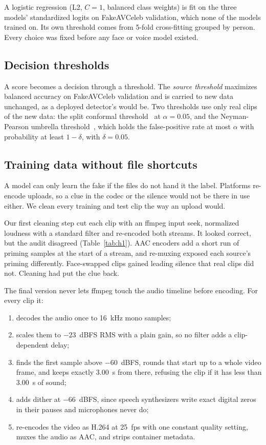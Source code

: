 \documentclass[conference]{IEEEtran}
\begin{document}
A logistic regression (L2, $C = 1$, balanced class weights) is fit on the
three models' standardized logits on FakeAVCeleb validation, which none of the
models trained on. Its own threshold comes from 5-fold cross-fitting grouped
by person. Every choice was fixed before any face or voice model existed.

\subsection{Decision thresholds}
\label{sec:compare}

A score becomes a decision through a threshold. The \textit{source threshold}
maximizes balanced accuracy on FakeAVCeleb validation and is carried to new
data unchanged, as a deployed detector's would be. Two thresholds use only real
clips of the new data: the split conformal threshold~\cite{bates2023} at
$\alpha = 0.05$, and the Neyman-Pearson umbrella threshold~\cite{tong2018},
which holds the false-positive rate at most $\alpha$ with probability at least
$1-\delta$, with $\delta = 0.05$.

\subsection{Training data without file shortcuts}
\label{sec:cleaning}

A model can only learn the fake if the files do not hand it the label. Platforms
re-encode uploads, so a clue in the codec or the silence would not be there in
use either. We clean every training and test clip the way an upload would.

Our first cleaning step cut each clip with an ffmpeg input seek, normalized
loudness with a standard filter and re-encoded both streams. It looked
correct, but the audit disagreed (Table~\ref{tab:h1}). AAC encoders add a short
run of priming samples at the start of a stream, and re-muxing exposed each
source's priming differently. Face-swapped clips gained leading silence that
real clips did not. Cleaning had put the clue back.

The final version never lets ffmpeg touch the audio timeline before encoding.
For every clip it:

\begin{enumerate}
\item decodes the audio once to 16~kHz mono samples;
\item scales them to $-23$~dBFS RMS with a plain gain, so no filter adds a
clip-dependent delay;
\item finds the first sample above $-60$~dBFS, rounds that start up to a whole
video frame, and keeps exactly 3.00~s from there, refusing the clip if it has
less than 3.00~s of sound;
\item adds dither at $-66$~dBFS, since speech synthesizers write exact digital
zeros in their pauses and microphones never do;
\item re-encodes the video as H.264 at 25~fps with one constant quality
setting, muxes the audio as AAC, and strips container metadata.
\end{enumerate}
\end{document}
